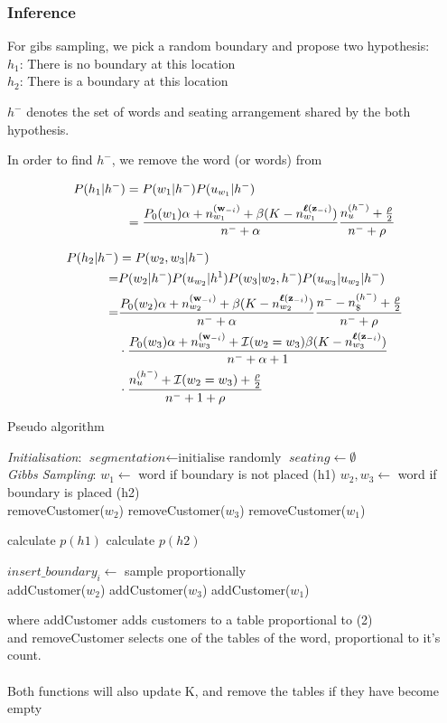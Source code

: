 \subsubsection{Inference}

For gibs sampling, we pick a random boundary and propose two hypothesis:
\\
$h_1$: There is no boundary at this location \\
$h_2$: There is a boundary at this location


$h^-$ denotes the set of words and seating arrangement shared by the both hypothesis.

In order to find $h^-$, we remove the word (or words) from 

\begin{align}
P(h_1 | h^-) &= P(w_1|h^-)P(u_{w_1} | h^{-}) \\
&= \dfrac{P_0(w_1)\alpha + n_{w_1}^{(\bm{\mathbf{w}}_{-i})}+ \beta (K - n_{w_1}^{\bm{\mathbf{\ell}}(\bm{\mathbf{z}}_{-i})})}{n^- + \alpha}
\dfrac{n_u^{(h^-)} + \frac{\rho}{2}}{n^- + \rho}
\end{align}

\begin{align}
P(h_2 | h^-) &= P(w_2,w_3|h^-)\\
=&P(w_2|h^-)P(u_{w_2}|h^1)P(w_3 | w_2,h^-)P(u_{w_3}|u_{w_2}|h^-) \\
=& \dfrac{P_0(w_2)\alpha + n_{w_2}^{(\bm{\mathbf{w}}_{-i})}+ \beta (K - n_{w_2}^{\bm{\mathbf{\ell}}(\bm{\mathbf{z}}_{-i})})}{n^- + \alpha}
\dfrac{n^- - n_\$^{(h^-)} + \frac{\rho}{2}}{n^- + \rho} \\
&\cdot 
\dfrac{P_0(w_3)\alpha + n_{w_3}^{(\bm{\mathbf{w}}_{-i})}+ \mathcal{I}(w_2 = w_3) \beta (K - n_{w_3}^{\bm{\mathbf{\ell}}(\bm{\mathbf{z}}_{-i})})}{n^- + \alpha + 1} \\
&\cdot
\dfrac{n_u^{(h^-)} + \mathcal{I}(w_2 = w_3)  + \frac{\rho}{2}}{n^- + 1 + \rho}
\end{align}

\begin{algorithm}
\caption{Pseudo algorithm}\label{euclid}
\begin{algorithmic}[1]
\BState \emph{Initialisation}:
\State $\textit{segmentation} \gets \text{initialise randomly}$
\State $seating \gets \emptyset$
\EndFor
\\
\BState \emph{Gibbs Sampling}:
	\State $w_1 \gets$ word if boundary is not placed (h1)
	\State $w_2, w_3 \gets$ word if boundary is  placed (h2)
	\\
		\State removeCustomer($w_2$)
		\State removeCustomer($w_3$)
	\Else
		\State removeCustomer($w_1$)	
	\EndIf

	\State calculate $p(h1)$
	\State calculate $p(h2)$
	
	\State $insert\_boundary_i \gets$ sample proportionally
	\\
		\State addCustomer($w_2$)
		\State addCustomer($w _3$)
	\Else 
		\State addCustomer($w_1$)	
	\EndIf
\EndFor
\EndProcedure
\end{algorithmic}
\end{algorithm}

	
where addCustomer adds customers to a table proportional to (2) \\
and removeCustomer selects one of the tables of the word, proportional to it's count. \\
\\
Both functions will also update K, and remove the tables if they have become empty